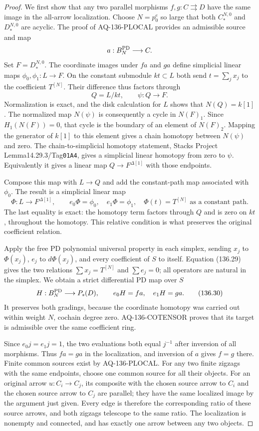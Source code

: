 \begin{proof}
We first show that any two parallel morphisms
$f,g:C\rightrightarrows D$ have the same image in the
all-arrow localization.  Choose $N=p_0^e$ so large that
both $C_*^{N,0}$ and $D_*^{N,0}$ are acyclic.  The proof
of AQ-136-PLOCAL provides an admissible source and map
\[
                         a:B_N^{\rm PD}\longrightarrow C.
\]
Set $F=D_*^{N,0}$.  The coordinate images under $fa$ and
$ga$ define simplicial linear maps
$\phi_0,\phi_1:L\to F$.  On the constant submodule
$kt\subset L$ both send $t=\sum_jx_j$ to the coefficient
$T^{[N]}$.  Their difference thus factors through
\[
             Q=L/kt,\qquad \psi:Q\longrightarrow F.        \tag{136.28}
\]
Normalization is exact, and the disk calculation for $L$
shows that $N(Q)=k[1]$.
The normalized map $N(\psi)$ is consequently a cycle in
$N(F)_1$.  Since $H_1(N(F))=0$, that cycle is the boundary
of an element of $N(F)_2$.  Mapping the generator of
$k[1]$ to this element gives a chain homotopy between
$N(\psi)$ and zero.  The chain-to-simplicial homotopy
statement, Stacks Project Lemma14.29.3/Tag\texttt{01A4},
gives a simplicial linear homotopy from zero to $\psi$.
Equivalently it gives a linear map
$Q\to F^{\Delta[1]}$ with those endpoints.

Compose this map with $L\to Q$ and add the constant-path
map associated with $\phi_0$.  The result is a simplicial
linear map
\[
 \Phi:L\longrightarrow F^{\Delta[1]},\qquad
 e_0\Phi=\phi_0,\quad e_1\Phi=\phi_1,\quad
 \Phi(t)=T^{[N]}\text{ as a constant path}.                 \tag{136.29}
\]
The last equality is exact: the homotopy term factors
through $Q$ and is zero on $kt$, throughout the homotopy.
This relative condition is what preserves the original
coefficient relation.

Apply the free PD polynomial universal property in each
simplex, sending $x_j$ to $\Phi(x_j)$, $e_j$ to
$d\Phi(x_j)$, and every coefficient of $S$ to itself.
Equation (136.29) gives the two relations
$\sum x_j=T^{[N]}$ and $\sum e_j=0$; all operators are
natural in the simplex.  We obtain a strict differential
PD map over $S$
\[
 H:B_N^{\rm PD}\longrightarrow P_s(D),\qquad
                         e_0H=fa,\quad e_1H=ga.            \tag{136.30}
\]
It preserves both gradings, because the coordinate
homotopy was carried out within weight $N$, cochain
degree zero.  AQ-136-COTENSOR proves that its target is
admissible over the same coefficient ring.

Since $e_0j=e_1j=1$, the two evaluations both equal
$j^{-1}$ after inversion of all morphisms.  Thus
$fa=ga$ in the localization, and inversion of $a$
gives $f=g$ there.
Finite common sources exist by AQ-136-PLOCAL.
For any two finite zigzags with the same endpoints,
choose one common source for all their objects.  For
an original arrow $u:C_i\to C_j$, its composite with
the chosen source arrow to $C_i$ and the chosen source
arrow to $C_j$ are parallel; they have the same localized
image by the argument just given.  Every edge is
therefore the corresponding ratio of these source
arrows, and both zigzags telescope to the same ratio.
The localization is nonempty and connected, and has
exactly one arrow between any two objects.


\end{proof}
